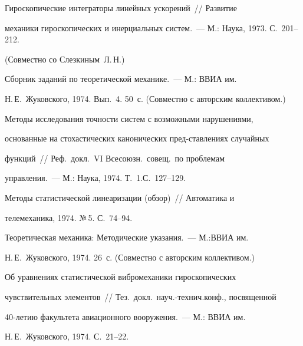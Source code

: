  Гироскопические интеграторы линейных ускорений~// Развитие


механики гироскопических и инерциальных систем.~--- М.: Наука, 1973. С.~201--212.


(Совместно со Слезкиным~Л.\,Н.)










 Сборник заданий по теоретической механике.~--- М.: ВВИА им.\


Н.\,Е.~Жуковского, 1974. Вып.~4. 50~с. (Совместно с авторским коллективом.)





 Методы исследования точности систем с возможными нарушениями,


основанные на стохастических канонических пред-\linebreak став\-ле\-ниях случайных


функций~// Реф.\ докл.\ VI Всесоюзн.\ совещ.\ по проблемам


 управления.~--- М.: Наука, 1974. Т.~1.\linebreak С.~127--129.





 Методы статистической линеаризации (обзор)~// Авто\-ма\-ти\-ка и


телемеханика, 1974. №\,5. С.~74--94.





 Теоретическая механика: Методические указания.~--- М.:\linebreak ВВИА им.\


Н.\,Е.~Жуковского, 1974. 26~с. (Совместно с авторским коллективом.)





 Об уравнениях статистической вибромеханики гироскопических


чувствительных элементов~// Тез.\ докл.\ науч.-технич.\linebreak конф., посвященной


 40-летию факультета авиационного вооружения.~--- М.: ВВИА им.\


Н.\,Е.~Жуковского, 1974. С.~21--22.











